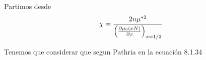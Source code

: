 \documentclass{report}
\begin{document}
\chapter{}

\section{}

Partimos desde \[\chi = \frac{2n\mu^{*2}}{\left(\frac{\partial \mu_0 \left(xN\right)}{\partial x}\right)_{x=1/2}}\]

Tenemos que considerar que segun Pathria en la ecuación 8.1.34

\section{}

\section{}

\chapter{}

\section{}

\section{}

\section{}

\section{}

\section{}

\section{}

\section{}
\end{document}
